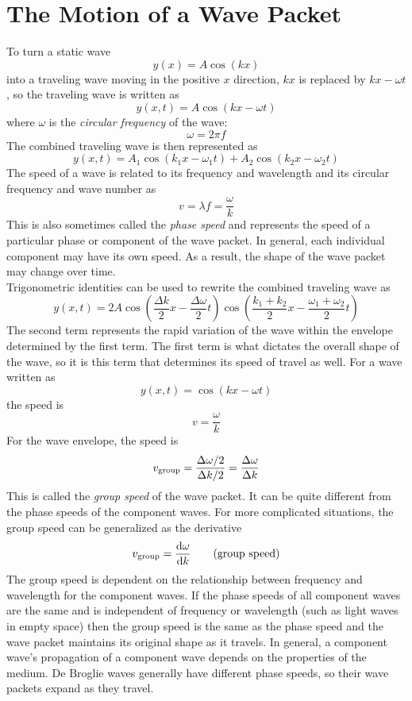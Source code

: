 \documentclass{subfiles}
\begin{document}
	\section{The Motion of a Wave Packet}
		To turn a static wave
			\[y(x) = A\cos(kx) \tag{static wave}\]
			into a traveling wave moving in the positive \(x\) direction, \(kx\) is replaced by \(kx - \omega t\), so the traveling wave is written as
			\[y(x, t) = A\cos(kx - \omega t) \tag{traveling wave}\]
			where \(\omega\) is the \textit{circular frequency} of the wave:
			\[\omega = 2\pi f \tag{circular frequency}\]
			The combined traveling wave is then represented as
			\[y(x, t) = A_1\cos(k_1x - \omega_1 t) + A_2\cos(k_2x - \omega_2 t)\]
			The speed of a wave is related to its frequency and wavelength and its circular frequency and wave number as
			\[
				v = \lambda f 
					= \frac{\omega}{k}
					\tag{wave speed}
			\]
			This is also sometimes called the \textit{phase speed} and represents the speed of a particular phase or component of the wave packet. In general, each individual component may have its own speed. As a result, the shape of the wave packet may change over time. \\
			Trigonometric identities can be used to rewrite the combined traveling wave as
			\[y(x, t) = 2A\cos(\frac{\Delta k}{2}x - \frac{\Delta\omega}{2}t)\cos(\frac{k_1 + k_2}{2}x - \frac{\omega_1 + \omega_2}{2}t) \tag{combined traveling wave}\]
			The second term represents the rapid variation of the wave within the envelope determined by the first term. The first term is what dictates the overall shape of the wave, so it is this term that determines its speed of travel as well. For a wave written as
			\[y(x, t) = \cos(kx - \omega t)\]
			the speed is
			\[v = \frac{\omega}{k}\]
			For the wave envelope, the speed is
			\[
				v_{\text{group}} = \frac{\Delta\omega/2}{\Delta k/2}
					= \frac{\Delta\omega}{\Delta k}
			\]
			This is called the \textit{group speed} of the wave packet. It can be quite different from the phase speeds of the component waves. For more complicated situations, the group speed can be generalized as the derivative
			\[v_{\text{group}} = \dv{\omega}{k} \tag{group speed}\]
			The group speed is dependent on the relationship between frequency and wavelength for the component waves. If the phase speeds of all component waves are the same and is independent of frequency or wavelength (such as light waves in empty space) then the group speed is the same as the phase speed and the wave packet maintains its original shape as it travels. In general, a component wave's propagation of a component wave depends on the properties of the medium. De Broglie waves generally have different phase speeds, so their wave packets expand as they travel.
\end{document}
